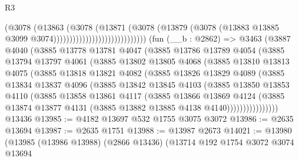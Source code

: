 \begin{lexlean}{R3}
\begin{coremodule}
                                              (@3078
                                                (@13863
                                                  (@3078
                                                    (@13871
                                                      (@3078
                                                        (@13879
                                                          (@3078
                                                            (@13883
                                                              @13885
                                                              @3099
                                                              @3074)))))))))))))))))))))))))))))
    (fun (__b : @2862) =>
    @3463
      (@3887
        @4040
        (@3885
          @13778
          @13781
          @4047
          (@3885
            @13786
            @13789
            @4054
            (@3885
              @13794
              @13797
              @4061
              (@3885
                @13802
                @13805
                @4068
                (@3885
                  @13810
                  @13813
                  @4075
                  (@3885
                    @13818
                    @13821
                    @4082
                    (@3885
                      @13826
                      @13829
                      @4089
                      (@3885
                        @13834
                        @13837
                        @4096
                        (@3885
                          @13842
                          @13845
                          @4103
                          (@3885
                            @13850
                            @13853
                            @4110
                            (@3885
                              @13858
                              @13861
                              @4117
                              (@3885
                                @13866
                                @13869
                                @4124
                                (@3885
                                  @13874
                                  @13877
                                  @4131
                                  (@3885 @13882 @13885 @4138 @4140))))))))))))))))
    @13436
@13985 := @4182 @13697 @532 @1755 @3075 @3072
@13986 := @2635 @13694
@13987 := @2635 @1751
@13988 := @13987 @2673
@14021 := @13980
    (@13985
      (@13986 @13988)
      (@2866 @13436)
      (@13714
        @192
        @1754
        @3072
        @3074
        @13694

\end{coremodule}
\end{lexlean}
